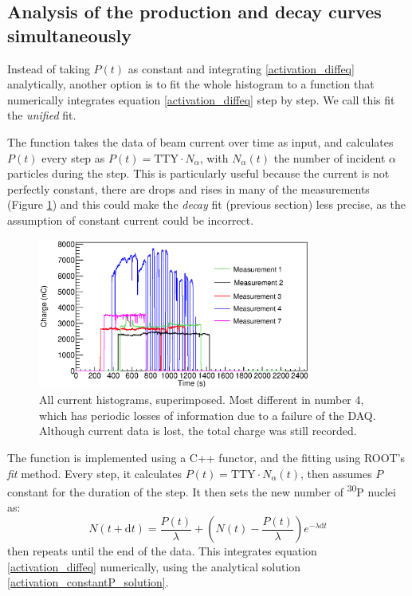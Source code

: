 \documentclass[a4paper,12pt]{report}
\newcommand{\dif}{\text{d}}
\newcommand{\Piso}{\textsuperscript{30}P }
\begin{document}
\subsection{Analysis of the production and decay curves simultaneously}
Instead of taking $P(t)$ as constant and integrating \ref{activation_diffeq} analytically, another option is to fit the whole histogram to a function that numerically integrates equation \ref{activation_diffeq} step by step.
We call this fit the \textit{unified} fit.

The function takes the data of beam current over time as input, and calculates $P(t)$ every step as $P(t) = \text{TTY}\cdot N_\alpha$, with $N_\alpha(t)$ the number of incident $\alpha$ particles during the step.
This is particularly useful because the current is not perfectly constant, there are drops and rises in many of the measurements (Figure \ref{current_histograms}) and this could make the \textit{decay} fit (previous section) less precise, as the assumption of constant current could be incorrect.
\\
\begin{figure}[H]
	\centering
	\includegraphics[width=0.80\textwidth]{current_histograms.eps}
	\caption{All current histograms, superimposed.
	Most different in number 4, which has periodic losses of information due to a failure of the DAQ.
	Although current data is lost, the total charge was still recorded.}
	\label{current_histograms}
\end{figure}

The function is implemented using a C++ functor, and the fitting using ROOT's \textit{fit} method.
Every step, it calculates $P(t) = \text{TTY}\cdot N_\alpha(t)$, then assumes $P$ constant for the duration of the step.
It then sets the new number of \Piso nuclei as:
\begin{equation}
	N(t+\dif t)=\frac{P(t)}{\lambda} + \left( N(t)-\frac{P(t)}{\lambda} \right) e^{-\lambda \dif t}
\end{equation}
then repeats until the end of the data.
This integrates equation \ref{activation_diffeq} numerically, using the analytical solution \ref{activation_constantP_solution}.
\end{document}
